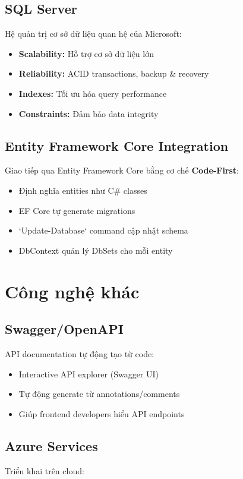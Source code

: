 \subsection{SQL Server}
Hệ quản trị cơ sở dữ liệu quan hệ của Microsoft:

\begin{itemize}
    \item \textbf{Scalability:} Hỗ trợ cơ sở dữ liệu lớn
    \item \textbf{Reliability:} ACID transactions, backup \& recovery
    \item \textbf{Indexes:} Tối ưu hóa query performance
    \item \textbf{Constraints:} Đảm bảo data integrity
\end{itemize}

\subsection{Entity Framework Core Integration}
Giao tiếp qua Entity Framework Core bằng cơ chế \textbf{Code-First}:

\begin{itemize}
    \item Định nghĩa entities như C\# classes
    \item EF Core tự generate migrations
    \item `Update-Database` command cập nhật schema
    \item DbContext quản lý DbSets cho mỗi entity
\end{itemize}

\section{Công nghệ khác}

\subsection{Swagger/OpenAPI}
API documentation tự động tạo từ code:

\begin{itemize}
    \item Interactive API explorer (Swagger UI)
    \item Tự động generate từ annotations/comments
    \item Giúp frontend developers hiểu API endpoints
\end{itemize}

\subsection{Azure Services}
Triển khai trên cloud:

